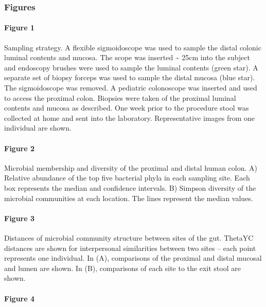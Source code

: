 \documentclass[11pt,]{article}
\let\oldparagraph\paragraph
\renewcommand{\paragraph}[1]{\oldparagraph{#1}\mbox{}}
\begin{document}
\newpage

\subsubsection{Figures}\label{figures}

\paragraph{Figure 1}\label{figure-1}

Sampling strategy. A flexible sigmoidoscope was used to sample the
distal colonic luminal contents and mucosa. The scope was inserted
\textasciitilde{} 25cm into the subject and endoscopy brushes were used
to sample the luminal contents (green star). A separate set of biopsy
forceps was used to sample the distal mucosa (blue star). The
sigmoidoscope was removed. A pediatric colonoscope was inserted and used
to access the proximal colon. Biopsies were taken of the proximal
luminal contents and mucosa as described. One week prior to the
procedure stool was collected at home and sent into the laboratory.
Representative images from one individual are shown.

\newpage

\paragraph{Figure 2}\label{figure-2}

Microbial membership and diversity of the proximal and distal human
colon. A) Relative abundance of the top five bacterial phyla in each
sampling site. Each box represents the median and confidence intervals.
B) Simpson diversity of the microbial communities at each location. The
lines represent the median values.

\newpage

\paragraph{Figure 3}\label{figure-3}

Distances of microbial community structure between sites of the gut.
ThetaYC distances are shown for interpersonal similarities between two
sites -- each point represents one individual. In (A), comparisons of
the proximal and distal mucosal and lumen are shown. In (B), comparisons
of each site to the exit stool are shown.

\newpage

\paragraph{Figure 4}\label{figure-4}
\end{document}
